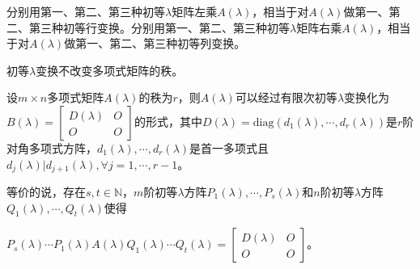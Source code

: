         分别用第一、第二、第三种初等$\lambda$矩阵左乘$A(\lambda)$，相当于对$A(\lambda)$做第一、第二、第三种初等行变换。分别用第一、第二、第三种初等$\lambda$矩阵右乘$A(\lambda)$，相当于对$A(\lambda)$做第一、第二、第三种初等列变换。

        初等$\lambda$变换不改变多项式矩阵的秩。

        \begin{theorem}
            \label{thm:poly_matrix_rank}
            设$m\times n$多项式矩阵$A(\lambda)$的秩为$r$，则$A(\lambda)$可以经过有限次初等$\lambda$变换化为$B(\lambda)=\begin{bmatrix}D(\lambda)&O\\O&O\end{bmatrix}$的形式，其中$D(\lambda)=\mathrm{diag}(d_1(\lambda),\cdots,d_r(\lambda))$是$r$阶对角多项式方阵，$d_1(\lambda),\cdots,d_r(\lambda)$是首一多项式且$d_j(\lambda)|d_{j+1}(\lambda),\forall j=1,\cdots,r-1$。

            等价的说，存在$s,t\in\mathbb{N}$，$m$阶初等$\lambda$方阵$P_1(\lambda),\cdots,P_s(\lambda)$和$n$阶初等$\lambda$方阵$Q_1(\lambda),\cdots,Q_t(\lambda)$使得

            $P_s(\lambda)\cdots P_1(\lambda)A(\lambda)Q_1(\lambda)\cdots Q_t(\lambda)=\begin{bmatrix}D(\lambda)&O\\O&O\end{bmatrix}$。
        \end{theorem}

